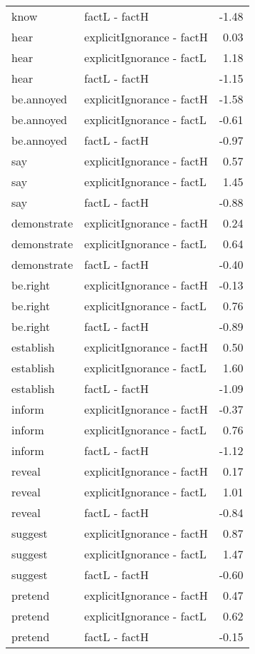 \begin{longtable}{llr}
  know & factL - factH & -1.48 \\ 
  hear & explicitIgnorance - factH & 0.03 \\ 
  hear & explicitIgnorance - factL & 1.18 \\ 
  hear & factL - factH & -1.15 \\ 
  be.annoyed & explicitIgnorance - factH & -1.58 \\ 
  be.annoyed & explicitIgnorance - factL & -0.61 \\ 
  be.annoyed & factL - factH & -0.97 \\ 
  say & explicitIgnorance - factH & 0.57 \\ 
  say & explicitIgnorance - factL & 1.45 \\ 
  say & factL - factH & -0.88 \\ 
  demonstrate & explicitIgnorance - factH & 0.24 \\ 
  demonstrate & explicitIgnorance - factL & 0.64 \\ 
  demonstrate & factL - factH & -0.40 \\ 
  be.right & explicitIgnorance - factH & -0.13 \\ 
  be.right & explicitIgnorance - factL & 0.76 \\ 
  be.right & factL - factH & -0.89 \\ 
  establish & explicitIgnorance - factH & 0.50 \\ 
  establish & explicitIgnorance - factL & 1.60 \\ 
  establish & factL - factH & -1.09 \\ 
  inform & explicitIgnorance - factH & -0.37 \\ 
  inform & explicitIgnorance - factL & 0.76 \\ 
  inform & factL - factH & -1.12 \\ 
  reveal & explicitIgnorance - factH & 0.17 \\ 
  reveal & explicitIgnorance - factL & 1.01 \\ 
  reveal & factL - factH & -0.84 \\ 
  suggest & explicitIgnorance - factH & 0.87 \\ 
  suggest & explicitIgnorance - factL & 1.47 \\ 
  suggest & factL - factH & -0.60 \\ 
  pretend & explicitIgnorance - factH & 0.47 \\ 
  pretend & explicitIgnorance - factL & 0.62 \\ 
  pretend & factL - factH & -0.15 \\ 
  \end{longtable}

